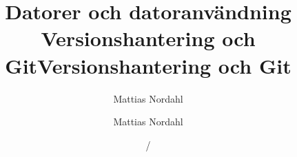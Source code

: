 \documentclass[handout]{beamer}
\author[]{Mattias Nordahl}
\institute{\url{mattias.nordahl@cs.lth.se}}
\date{}
\begin{document}
 

\title{Datorer och datoranvändning\\Versionshantering och Git} 

\frame[plain]{
\maketitle

\vspace{-2\baselineskip}
}

\title{Versionshantering och Git}
\institute{}
\author{Mattias Nordahl}
\date{\the\year/\the\numexpr{}} 


\end{document}
